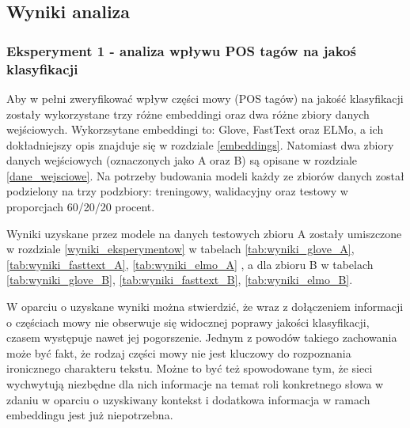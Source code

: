 

\subsection{Wyniki analiza}

\subsubsection{Eksperyment 1 - analiza wpływu POS tagów na jakoś klasyfikacji}

Aby w pełni zweryfikować wpływ części mowy (POS tagów) na jakość klasyfikacji zostały wykorzystane trzy różne embeddingi oraz dwa różne zbiory danych wejściowych. Wykorzsytane embeddingi to: Glove, FastText oraz ELMo, a ich dokładniejszy opis znajduje się w rozdziale \ref{embeddings}. Natomiast dwa zbiory danych wejściowych (oznaczonych jako A oraz B) są opisane w rozdziale \ref{dane_wejsciowe}. Na potrzeby budowania modeli każdy ze zbiorów danych został podzielony na trzy podzbiory: treningowy, walidacyjny oraz testowy w proporcjach 60/20/20 procent.

Wyniki uzyskane przez modele na danych testowych zbioru A zostały umiszczone w rozdziale \ref{wyniki_eksperymentow} w tabelach \ref{tab:wyniki_glove_A}, \ref{tab:wyniki_fasttext_A}, \ref{tab:wyniki_elmo_A} , a dla zbioru B w tabelach \ref{tab:wyniki_glove_B}, \ref{tab:wyniki_fasttext_B}, \ref{tab:wyniki_elmo_B}.


W oparciu o uzyskane wyniki można stwierdzić, że wraz z dołączeniem informacji o częściach mowy nie obserwuje się widocznej poprawy jakości klasyfikacji, czasem występuje nawet jej pogorszenie. Jednym z powodów takiego zachowania może być fakt, że rodzaj części mowy nie jest kluczowy do rozpoznania ironicznego charakteru tekstu. Możne to być też spowodowane tym, że sieci wychwytują niezbędne dla nich informacje na temat roli konkretnego słowa w zdaniu w oparciu o uzyskiwany kontekst i dodatkowa informacja w ramach embeddingu jest już niepotrzebna.

